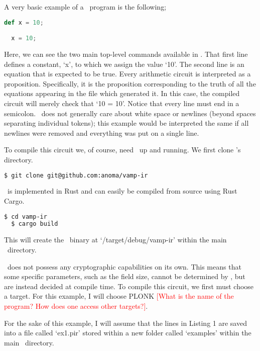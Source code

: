 A very basic example of a \vampir\ program is the following;

\begin{lstlisting}[language=Python, caption={A Very Simple \vampir\ File}]
  def x = 10;

  x = 10;
\end{lstlisting}

Here, we can see the two main top-level commands available in \vampir. That first line defines a constant, `x', to which we assign the value `10'. The second line is an equation that is expected to be true. Every arithmetic circuit is interpreted as a proposition. Specifically, it is the proposition corresponding to the truth of all the equations appearing in the file which generated it. In this case, the compiled circuit will merely check that `10 = 10'. Notice that every line must end in a semicolon. \vampir\ does not generally care about white space or newlines (beyond spaces separating individual tokens); this example would be interpreted the same if all newlines were removed and everything was put on a single line.

To compile this circuit we, of course, need \vampir\ up and running. We first clone \vampir's directory.

\begin{lstlisting}[language=bash]
  $ git clone git@github.com:anoma/vamp-ir
\end{lstlisting}

\vampir\ is implemented in Rust and can easily be compiled from source using Rust Cargo.

\begin{lstlisting}[language=bash]
  $ cd vamp-ir
  $ cargo build
\end{lstlisting}

This will create the \vampir\ binary at `/target/debug/vamp-ir' within the main \vampir\ directory.

\vampir\ does not possess any cryptographic capabilities on its own. This means that some specific parameters, such as the field size, cannot be determined by \vampir, but are instead decided at compile time. To compile this circuit, we first must choose a target. For this example, I will choose PLONK \textcolor{red}{[What is the name of the program? How does one access other targets?]}.

For the sake of this example, I will assume that the lines in Listing 1 are saved into a file called `ex1.pir' stored within a new folder called `examples' within the main \vampir\ directory. 

